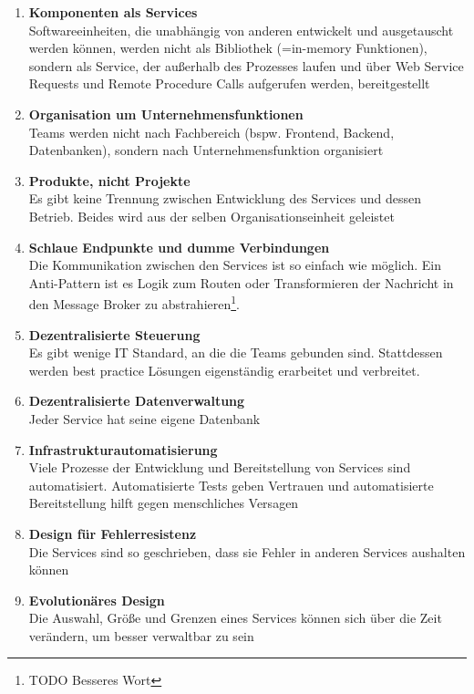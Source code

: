 \begin{enumerate}
  \item \textbf{Komponenten als Services}\label{componentes-as-service} \\
        Softwareeinheiten, die unabhängig von anderen entwickelt und
        ausgetauscht werden können, werden nicht als Bibliothek (=in-memory
        Funktionen), sondern als Service, der außerhalb des Prozesses laufen und
        über Web Service Requests und Remote Procedure Calls aufgerufen werden, bereitgestellt
  \item \textbf{Organisation um Unternehmensfunktionen} \\
        Teams werden nicht nach Fachbereich (bspw. Frontend, Backend,
        Datenbanken), sondern nach Unternehmensfunktion organisiert
  \item \textbf{Produkte, nicht Projekte} \\
        Es gibt keine Trennung zwischen Entwicklung des Services und dessen
        Betrieb. Beides wird aus der selben Organisationseinheit geleistet
  \item \textbf{Schlaue Endpunkte und dumme Verbindungen} \\
        Die Kommunikation zwischen den Services ist so einfach wie möglich. Ein
        Anti-Pattern ist es Logik zum Routen oder Transformieren der Nachricht
        in den Message Broker zu abstrahieren\footnote{TODO Besseres Wort}.
  \item \textbf{Dezentralisierte Steuerung} \\
        Es gibt wenige IT Standard, an die die Teams gebunden sind. Stattdessen
        werden best practice Lösungen eigenständig erarbeitet und verbreitet.
  \item \textbf{Dezentralisierte Datenverwaltung} \\
        Jeder Service hat seine eigene Datenbank
  \item \textbf{Infrastrukturautomatisierung} \\
        Viele Prozesse der Entwicklung und Bereitstellung von Services sind
        automatisiert. Automatisierte Tests geben Vertrauen und automatisierte
        Bereitstellung hilft gegen menschliches Versagen
  \item \textbf{Design für Fehlerresistenz} \\
        Die Services sind so geschrieben, dass sie Fehler in anderen Services
        aushalten können
  \item \textbf{Evolutionäres Design} \\
        Die Auswahl, Größe und Grenzen eines Services können sich über die Zeit
        verändern, um besser verwaltbar zu sein
\end{enumerate}


